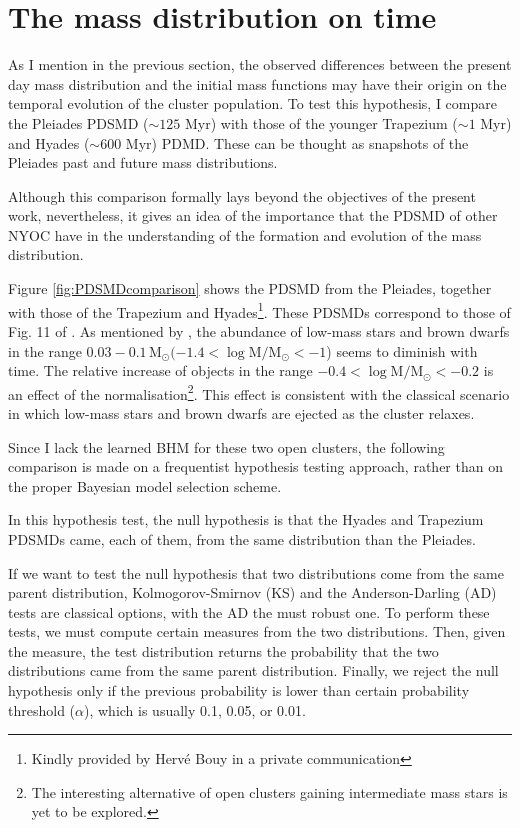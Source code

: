 \section{The mass distribution on time}
As I mention in the previous section, the observed differences between the present day mass distribution and the initial mass functions may have their origin on the temporal evolution of the cluster population. To test this hypothesis, I compare the Pleiades PDSMD ($\sim125$ Myr) with those of the younger Trapezium ($\sim1$ Myr) and Hyades ($\sim 600$ Myr) PDMD. These can be thought as snapshots of the Pleiades past and future mass distributions.

Although this comparison formally lays beyond the objectives of the present work, nevertheless, it gives an idea of the importance that the PDSMD of other NYOC have in the understanding of the formation and evolution of the mass distribution.

Figure \ref{fig:PDSMDcomparison} shows the PDSMD from the Pleiades, together with those of the Trapezium and Hyades\footnote{Kindly provided by Herv\'e Bouy in a private communication}. These PDSMDs correspond to those of  Fig. 11 of \citet{Bouy2015}. As mentioned by \citet{Bouy2015}, the abundance of low-mass stars and brown dwarfs in the range $0.03 - 0.1\,\mathrm{M_{\odot}}(-1.4 < \log \mathrm{M/M_{\odot}} <-1$) seems to diminish with time. The relative increase of objects in the range $-0.4 < \mathrm{\log M/M_{\odot}} < -0.2$ is an effect of the normalisation\footnote{The interesting alternative of open clusters gaining intermediate mass stars is yet to be explored.}. This effect is consistent with the classical scenario in which low-mass stars and brown dwarfs are ejected as the cluster relaxes.

Since I lack the learned BHM for these two open clusters, the following comparison is made on a frequentist hypothesis testing approach, rather than on the proper Bayesian model selection scheme.

In this hypothesis test, the null hypothesis is that the Hyades and Trapezium PDSMDs came, each of them, from the same distribution than the Pleiades. 

If we want to test the null hypothesis that two distributions come from the same parent distribution, Kolmogorov-Smirnov (KS) and the Anderson-Darling (AD) tests are classical options, with the AD the must robust one. To perform these tests, we must compute certain measures from the two distributions. Then, given the measure, the test distribution returns the probability that the two distributions came from the same parent distribution. Finally, we reject the null hypothesis only if the previous probability is lower than certain probability threshold ($\alpha$), which is usually 0.1, 0.05, or 0.01. 

